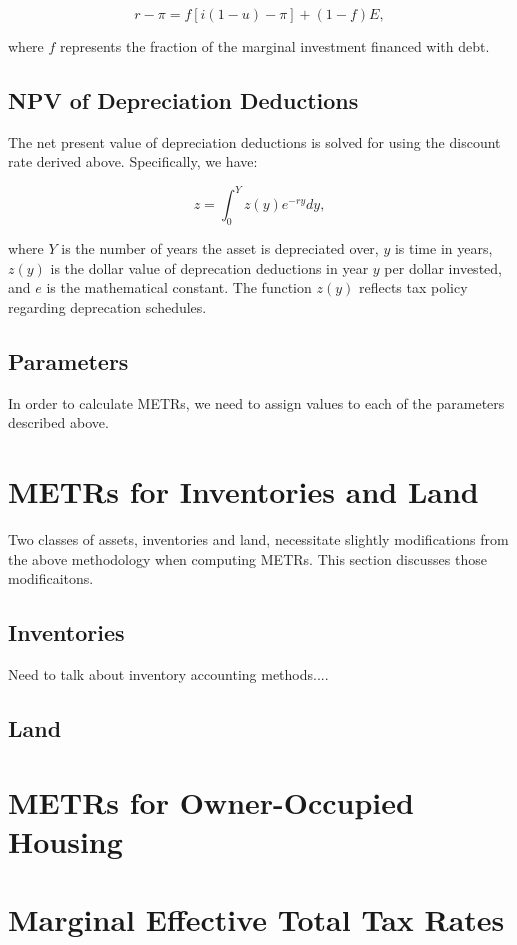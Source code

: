 \documentclass[article,11pt,letterpaper,fleqn]{article}
\theoremstyle{definition}
\numberwithin{equation}{section}
\begin{document}
\begin{equation}
r-\pi = f\left[i(1-u)-\pi\right] + (1-f)E,
\end{equation}

\noindent\noindent where $f$ represents the fraction of the marginal investment financed with debt.

\subsection{NPV of Depreciation Deductions}

The net present value of depreciation deductions is solved for using the discount rate derived above.  Specifically, we have: 

\begin{equation}
z = \int_{0}^{Y}z(y)e^{-ry}dy,
\end{equation}

\noindent\noindent where $Y$ is the number of years the asset is depreciated over, $y$ is time in years, $z(y)$ is the dollar value of deprecation deductions in year $y$ per dollar invested, and $e$ is the mathematical constant.  The function $z(y)$ reflects tax policy regarding deprecation schedules.  

\subsection{Parameters}

In order to calculate METRs, we need to assign values to each of the parameters described above.  


\section{METRs for Inventories and Land}

Two classes of assets, inventories and land, necessitate slightly modifications from the above methodology when computing METRs.  This section discusses those modificaitons.

\subsection{Inventories}

Need to talk about inventory accounting methods....

\subsection{Land}



\section{METRs for Owner-Occupied Housing}

\section{Marginal Effective Total Tax Rates}




\end{document}
